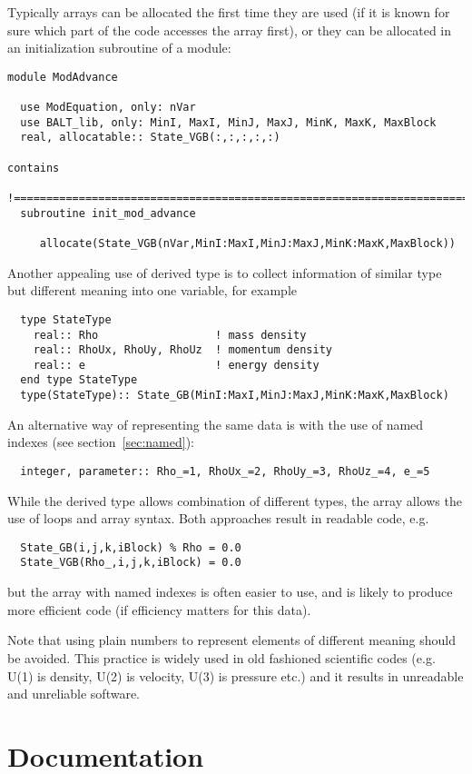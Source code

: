 \documentclass{article}
\begin{document}
Typically arrays can be allocated the first time they are used (if it
is known for sure which part of the code accesses the array first),
or they can be allocated in an initialization subroutine of a module:
\begin{verbatim}
module ModAdvance

  use ModEquation, only: nVar
  use BALT_lib, only: MinI, MaxI, MinJ, MaxJ, MinK, MaxK, MaxBlock
  real, allocatable:: State_VGB(:,:,:,:,:)

contains
  !========================================================================
  subroutine init_mod_advance

     allocate(State_VGB(nVar,MinI:MaxI,MinJ:MaxJ,MinK:MaxK,MaxBlock))
\end{verbatim}
Another appealing use of derived type is to collect information of
similar type but different meaning into one variable, for example
\begin{verbatim}
  type StateType
    real:: Rho                  ! mass density
    real:: RhoUx, RhoUy, RhoUz  ! momentum density
    real:: e                    ! energy density
  end type StateType
  type(StateType):: State_GB(MinI:MaxI,MinJ:MaxJ,MinK:MaxK,MaxBlock)
\end{verbatim}
An alternative way of representing the
same data is with the use of named indexes (see section~\ref{sec:named}):
\begin{verbatim}
  integer, parameter:: Rho_=1, RhoUx_=2, RhoUy_=3, RhoUz_=4, e_=5
\end{verbatim}
While the derived type allows combination of different types, 
the array allows the use of loops and array syntax. Both approaches
result in readable code, e.g.
\begin{verbatim}
  State_GB(i,j,k,iBlock) % Rho = 0.0
  State_VGB(Rho_,i,j,k,iBlock) = 0.0
\end{verbatim}
but the array with named indexes is often easier to use, and is likely
to produce more efficient code (if efficiency matters for this data).

Note that using plain numbers to represent elements of different meaning 
should be avoided. This practice is widely used in old fashioned scientific
codes (e.g. U(1) is density, U(2) is velocity, U(3) is pressure etc.)
and it results in unreadable and unreliable software.

\section{Documentation}
\end{document}
